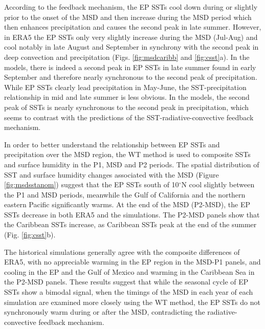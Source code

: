 According to the feedback mechanism, the EP SSTs cool down during or slightly prior to the onset of the MSD and then increase during the MSD period which then enhances precipitation and causes the second peak in late summer. However, in ERA5 the EP SSTs only very slightly increase during the MSD (Jul-Aug) and cool notably in late August and September in synchrony with the second peak in deep convection and precipitation (Figs. \ref{fig:msdcaribb} and \ref{fig:csst}a).
 In the models, there is indeed a second peak in EP SSTs in late summer found in early September and therefore nearly synchronous to the second peak of precipitation. While EP SSTs clearly lead precipitation in May-June, the SST-precipitation relationship in mid and late summer is less obvious. In the models, the second peak of SSTs is nearly synchronous to the second peak in precipitation, which seems to contrast with the predictions of the SST-radiative-convective feedback mechanism.
 
In order to better understand the relationship between EP SSTs and precipitation over the MSD region, the WT method is used to composite SSTs and surface humidity in the P1, MSD and P2 periods. 
The spatial distribution of SST and surface humidity changes associated with the MSD  (Figure \ref{fig:msdsstanom}) suggest that the EP SSTs south of 10$^\circ$N cool slightly between the P1 and  MSD periods, meanwhile the Gulf of California and the northern eastern Pacific significantly warms. At the end of the MSD (P2-MSD), the EP SSTs decrease in both ERA5 and the simulations. 
The P2-MSD panels show that the Caribbean SSTs increase, as Caribbean SSTs peak at the end of the summer (Fig. \ref{fig:csst}b).

The historical simulations generally agree with the composite differences of ERA5, with no appreciable warming in the EP region in the MSD-P1 panels, and cooling in the EP and the Gulf of Mexico and warming in the Caribbean Sea in the P2-MSD panels.
These results suggest that while the seasonal cycle of EP SSTs show a bimodal signal, when the timings of the MSD in each year of each simulation are examined more closely using the WT method, the EP SSTs do not synchronously warm during or after the MSD, contradicting the radiative-convective feedback mechanism.



